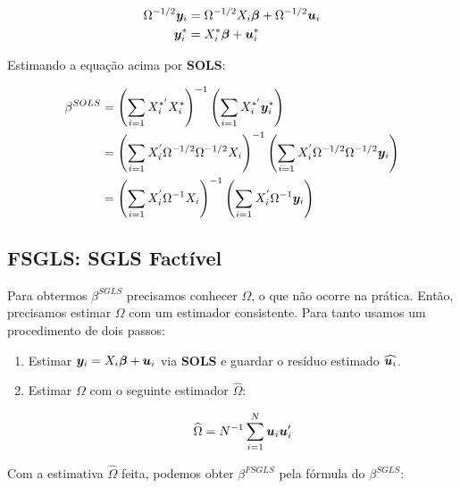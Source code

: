 \documentclass[11pt,oneside,a4paper]{article}
\numberwithin{equation}{section}
\begin{document}
\vspace{-1.5 em}
\begin{align*}
\Omega^{-1/2} \boldsymbol{y}_{i} 
&=
\Omega^{-1/2} X_{i} \boldsymbol{\beta}
+
\Omega^{-1/2} \boldsymbol{u}_{i}
\\
\boldsymbol{y}_{i}^{*}
&=
X_{i}^{*} \boldsymbol{\beta}
+
\boldsymbol{u}^{*}_{i}
\end{align*}

Estimando a equação acima por \textbf{SOLS}:

\vspace{-1.5 em}
\begin{align*}
\beta^{SOLS}
&=
\left( \sum_{i=1} X_{i}^{*'} X_{i}^{*} \right)^{-1}
\left( \sum_{i=1} X_{i}^{*'} \boldsymbol{y}_{i}^{*} \right)
\\
&=
\left( \sum_{i=1} X_{i}^{'} \Omega^{-1/2} \Omega^{-1/2} X_{i} \right)^{-1}
\left( \sum_{i=1} X_{i}^{'} \Omega^{-1/2} \Omega^{-1/2} \boldsymbol{y}_{i} \right)
\\
&=
\left( \sum_{i=1} X_{i}^{'} \Omega^{-1} X_{i} \right)^{-1}
\left( \sum_{i=1} X_{i}^{'} \Omega^{-1} \boldsymbol{y}_{i} \right)
\end{align*}

\subsection*{FSGLS: SGLS Factível}

Para obtermos $\beta^{SGLS}$ precisamos conhecer $\Omega$, o que não ocorre na prática.
Então, precisamos estimar $\Omega$ com um estimador consistente.
Para tanto usamos um procedimento de dois passos:

\begin{enumerate}
\item  %
Estimar $\boldsymbol{y}_{i} = X_{i} \boldsymbol{\beta} + \boldsymbol{u}_{i}$ via \textbf{SOLS} e guardar o resíduo estimado $\widehat{\boldsymbol{u}_{i}}$.

\item  %
Estimar $\Omega$ com o seguinte estimador $\widehat{\Omega}$:

\vspace{-1.5 em}
\begin{align*}
	\widehat{\Omega} 
	= 
	N^{-1} \sum_{i=1}^{N} \boldsymbol{u}_{i} \boldsymbol{u}_{i}'
\end{align*}
\end{enumerate}

Com a estimativa $\widehat{\Omega}$ feita, podemos obter $\beta^{FSGLS}$ pela fórmula do $\beta^{SGLS}$:
\end{document}
